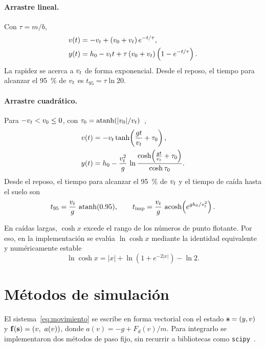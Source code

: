 \paragraph{Arrastre lineal.} Con $\tau = m/b$,
\begin{align}
  v(t) &= -v_t + (v_0 + v_t)\, e^{-t/\tau}, \\
  y(t) &= h_0 - v_t t + \tau\,(v_0 + v_t)\left(1 - e^{-t/\tau}\right).
\end{align}
La rapidez se acerca a $v_t$ de forma exponencial. Desde el reposo, el tiempo para alcanzar el \qty{95}{\percent} de $v_t$ es $t_{95} = \tau \ln 20$.

\paragraph{Arrastre cuadrático.} Para $-v_t < v_0 \le 0$, con $\tau_0 = \operatorname{atanh}(\lvert v_0\rvert/v_t)$~\cite{taylor},
\begin{align}
  v(t) &= -v_t \tanh\!\left(\frac{g t}{v_t} + \tau_0\right), \\
  y(t) &= h_0 - \frac{v_t^2}{g}\,
          \ln\frac{\cosh\!\left(\frac{g t}{v_t} + \tau_0\right)}{\cosh \tau_0}.
\end{align}
Desde el reposo, el tiempo para alcanzar el \qty{95}{\percent} de $v_t$ y el tiempo de caída hasta el suelo son
\begin{equation}
  t_{95} = \frac{v_t}{g}\,\operatorname{atanh}(0.95),
  \qquad
  t_{\text{imp}} = \frac{v_t}{g}\,\operatorname{acosh}\!\left(e^{g h_0/v_t^2}\right).
\end{equation}

En caídas largas, $\cosh x$ excede el rango de los números de punto flotante. Por eso, en la implementación se evalúa $\ln\cosh x$ mediante la identidad equivalente y numéricamente estable
\begin{equation}
  \ln\cosh x = \lvert x\rvert + \ln\!\left(1 + e^{-2\lvert x\rvert}\right) - \ln 2 .
\end{equation}

\section{Métodos de simulación}

El sistema~\eqref{eq:movimiento} se escribe en forma vectorial con el estado $\mathbf{s} = (y, v)$ y $\mathbf{f}(\mathbf{s}) = (v,\ a(v))$, donde $a(v) = -g + F_d(v)/m$. Para integrarlo se implementaron dos métodos de paso fijo, sin recurrir a bibliotecas como \texttt{scipy}~\cite{burden}.

